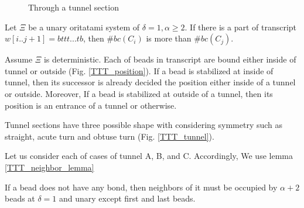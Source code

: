 \documentclass[runningheads]{llncs}
\begin{document}
\begin{figure}
\begin{center}
    \caption{Through a tunnel section}
    \label{TTT_tunnel_intro}
  \end{center}
\end{figure}




\begin{theorem}
Let $\Xi$ be a unary oritatami system of $\delta = 1, \alpha \geq 2$. If there is a part of transcript $w[i..j+1] = bttt...tb$, then $\#bc(C_i)$ is more than $\#bc(C_j)$.
\end{theorem}



\proof%
Assume $\Xi$ is deterministic. %
Each of beads in transcript are bound either inside of tunnel or outside (Fig. \ref{TTT_position}). If a bead is stabilized at inside of tunnel, then its successor is already decided the position either inside of a tunnel or outside. Moreover, If a bead is stabilized at outside of a tunnel, then its position is an entrance of a tunnel or otherwise.

Tunnel sections have three possible shape with considering symmetry such as straight, acute turn and obtuse turn (Fig. \ref{TTT_tunnel}). %

Let us consider each of cases of tunnel A, B, and C. Accordingly, We use lemma \ref{TTT_neighbor_lemma}

\begin{lemma}
\label{TTT_neighbor_lemma}
If a bead does not have any bond, then neighbors of it must be occupied by $\alpha + 2$ beads at $\delta = 1$ and unary except first and last beads.
\end{lemma}
\end{document}
